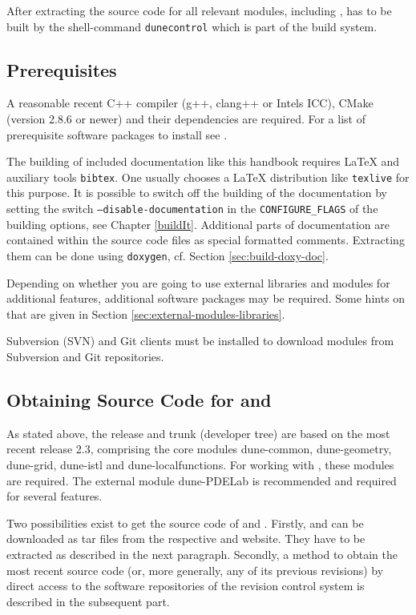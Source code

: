 After extracting the source code for all relevant \Dune modules, including \Dumux, \Dune has to be built
by the shell-command \texttt{dunecontrol} which is part of the \Dune build system.

\subsection{Prerequisites} \label{sec:prerequisites}
A reasonable recent C++ compiler (g++, clang++ or Intels ICC), CMake (version 2.8.6 or newer) and their
dependencies are required.
For a list of prerequisite software packages to install see \cite{DUNE-WIKI-PREREQUISITE-SOFTWARE}.

The building of included documentation like this handbook requires \LaTeX{} and auxiliary tools
\texttt{bibtex}. One usually chooses a \LaTeX{} distribution like \texttt{texlive} for this purpose.
It is possible to switch off the building of the documentation by setting the switch \texttt{--disable-documentation}
in the \texttt{CONFIGURE\_FLAGS} of the building options, see Chapter \ref{buildIt}.
Additional parts of documentation are contained within the source code files as special formatted comments.
Extracting them can be done using \texttt{doxygen}, cf. Section \ref{sec:build-doxy-doc}.

Depending on whether you are going to use external libraries and modules for additional \Dune features,
additional software packages may be required. Some hints on that are given in Section \ref{sec:external-modules-libraries}.

Subversion (SVN) and Git clients must be installed to download modules from Subversion and Git repositories.

\subsection{Obtaining Source Code for \Dune and \Dumux}
As stated above, the \Dumux release and trunk (developer tree) are based on the most recent
\Dune release 2.3, comprising the core modules dune-common, dune-geometry, dune-grid,
dune-istl and dune-localfunctions. For working with \Dumux, these modules are required. The
external module dune-PDELab is recommended and required for several \Dumux features.

Two possibilities exist to get the source code of \Dune and \Dumux.
Firstly, \Dune and \Dumux can be downloaded as tar files from the respective \Dune and \Dumux website.
They have to be extracted as described in the next paragraph.
Secondly, a method to obtain the most recent source code (or, more generally, any of its previous revisions) by direct access
to the software repositories of the revision control system is described in the subsequent part.

